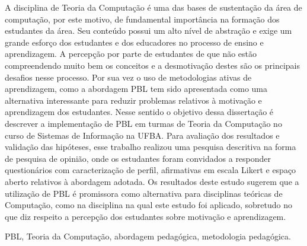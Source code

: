 \resumo
A disciplina de Teoria da Computação é uma das bases de
sustentação da área de computação, por este motivo, de
fundamental importância na formação dos estudantes
da área.
Seu conteúdo possui um alto nível de abstração e exige
um grande esforço dos estudantes e dos educadores
no processo de ensino e aprendizagem.
A percepção por parte de estudantes de
que não estão compreendendo muito bem os conceitos e
a desmotivação destes são os principais desafios nesse processo.
Por sua vez o uso de metodologias ativas de aprendizagem, como
a abordagem \ac{PBL} tem sido apresentada
como uma alternativa interessante para reduzir problemas relativos à motivação
e aprendizagem dos estudantes.
Nesse sentido o objetivo dessa dissertação é descrever a implementação
de \ac{PBL} em turmas de Teoria da Computação no curso de Sistemas
de Informação na \ac{UFBA}.
Para avaliação dos resultados e validação das hipóteses,
esse trabalho realizou uma pesquisa descritiva na forma
de pesquisa de opinião, onde
os estudantes foram convidados a responder questionários com
caracterização de perfil, afirmativas em escala Likert e
espaço aberto relativos à abordagem adotada. 
Os resultados deste estudo sugerem que a utilização de \ac{PBL}
é promissora como alternativa para disciplinas teóricas
de Computação, como na disciplina na qual este estudo foi
aplicado, sobretudo no que diz respeito a percepção
dos estudantes sobre motivação e aprendizagem.
\begin{keywords}
\ac{PBL}, Teoria da Computação, abordagem pedagógica, metodologia pedagógica.
\end{keywords}
